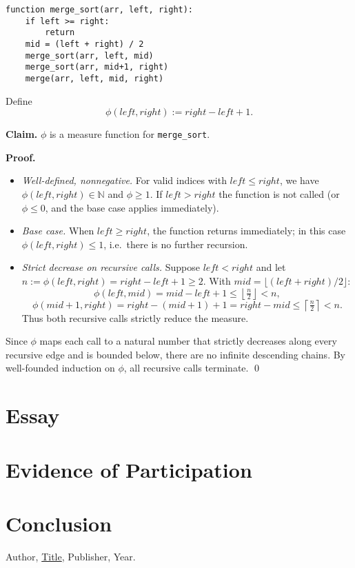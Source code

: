 \documentclass{article}
\theoremstyle{theorem}
\theoremstyle{definition}
\theoremstyle{remark}
\begin{document}
\begin{verbatim}
function merge_sort(arr, left, right):
    if left >= right:
        return
    mid = (left + right) / 2
    merge_sort(arr, left, mid)
    merge_sort(arr, mid+1, right)
    merge(arr, left, mid, right)
\end{verbatim}

Define
\[
\phi(left,right) := right - left + 1.
\]

\textbf{Claim.} $\phi$ is a measure function for \texttt{merge\_sort}.

\textbf{Proof.}
\begin{itemize}
    \item \emph{Well-defined, nonnegative.} For valid indices with $left \leq right$, we have $\phi(left,right) \in \mathbb{N}$ and $\phi \geq 1$. If $left > right$ the function is not called (or $\phi \leq 0$, and the base case applies immediately).
    \item \emph{Base case.} When $left \geq right$, the function returns immediately; in this case $\phi(left,right) \leq 1$, i.e.\ there is no further recursion.
    \item \emph{Strict decrease on recursive calls.} Suppose $left < right$ and let $n := \phi(left,right) = right-left+1 \geq 2$. With $mid = \lfloor (left+right)/2 \rfloor$:
    \[
    \phi(left,mid) = mid - left + 1 \leq \left\lfloor \tfrac{n}{2} \right\rfloor < n,
    \]
    \[
    \phi(mid+1,right) = right - (mid+1) + 1 = right - mid \leq \left\lceil \tfrac{n}{2} \right\rceil < n.
    \]
    Thus both recursive calls strictly reduce the measure.
\end{itemize}

Since $\phi$ maps each call to a natural number that strictly decreases along every recursive edge and is bounded below, there are no infinite descending chains. By well-founded induction on $\phi$, all recursive calls terminate. \qed



\section{Essay}

\section{Evidence of Participation}

\section{Conclusion}\label{conclusion}

\begin{thebibliography}{99}
 Author, \href{https://en.wikipedia.org/wiki/LaTeX}{Title}, Publisher, Year.
\end{thebibliography}
\end{document}
